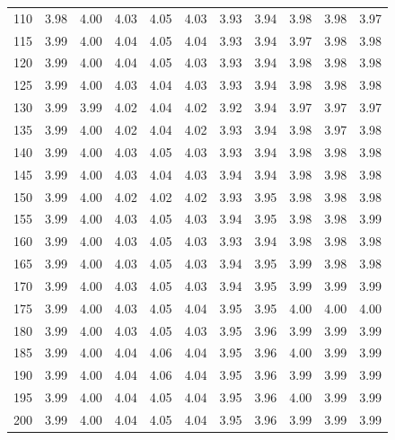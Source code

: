 \documentclass[preprint,12pt]{elsarticle}
\begin{document}
\begin{table}[ht]
\begin{tabular}{c|ccccc|ccccc}
  110 & 3.98 & 4.00 & 4.03 & 4.05 & 4.03 & 3.93 & 3.94 & 3.98 & 3.98 & 3.97 \\ 
  115 & 3.99 & 4.00 & 4.04 & 4.05 & 4.04 & 3.93 & 3.94 & 3.97 & 3.98 & 3.98 \\ 
  120 & 3.99 & 4.00 & 4.04 & 4.05 & 4.03 & 3.93 & 3.94 & 3.98 & 3.98 & 3.98 \\ 
  125 & 3.99 & 4.00 & 4.03 & 4.04 & 4.03 & 3.93 & 3.94 & 3.98 & 3.98 & 3.98 \\ 
  130 & 3.99 & 3.99 & 4.02 & 4.04 & 4.02 & 3.92 & 3.94 & 3.97 & 3.97 & 3.97 \\ 
  135 & 3.99 & 4.00 & 4.02 & 4.04 & 4.02 & 3.93 & 3.94 & 3.98 & 3.97 & 3.98 \\ 
  140 & 3.99 & 4.00 & 4.03 & 4.05 & 4.03 & 3.93 & 3.94 & 3.98 & 3.98 & 3.98 \\ 
  145 & 3.99 & 4.00 & 4.03 & 4.04 & 4.03 & 3.94 & 3.94 & 3.98 & 3.98 & 3.98 \\ 
  150 & 3.99 & 4.00 & 4.02 & 4.02 & 4.02 & 3.93 & 3.95 & 3.98 & 3.98 & 3.98 \\ 
  155 & 3.99 & 4.00 & 4.03 & 4.05 & 4.03 & 3.94 & 3.95 & 3.98 & 3.98 & 3.99 \\ 
  160 & 3.99 & 4.00 & 4.03 & 4.05 & 4.03 & 3.93 & 3.94 & 3.98 & 3.98 & 3.98 \\ 
  165 & 3.99 & 4.00 & 4.03 & 4.05 & 4.03 & 3.94 & 3.95 & 3.99 & 3.98 & 3.98 \\ 
  170 & 3.99 & 4.00 & 4.03 & 4.05 & 4.03 & 3.94 & 3.95 & 3.99 & 3.99 & 3.99 \\ 
  175 & 3.99 & 4.00 & 4.03 & 4.05 & 4.04 & 3.95 & 3.95 & 4.00 & 4.00 & 4.00 \\ 
  180 & 3.99 & 4.00 & 4.03 & 4.05 & 4.03 & 3.95 & 3.96 & 3.99 & 3.99 & 3.99 \\ 
  185 & 3.99 & 4.00 & 4.04 & 4.06 & 4.04 & 3.95 & 3.96 & 4.00 & 3.99 & 3.99 \\ 
  190 & 3.99 & 4.00 & 4.04 & 4.06 & 4.04 & 3.95 & 3.96 & 3.99 & 3.99 & 3.99 \\ 
  195 & 3.99 & 4.00 & 4.04 & 4.05 & 4.04 & 3.95 & 3.96 & 4.00 & 3.99 & 3.99 \\ 
  200 & 3.99 & 4.00 & 4.04 & 4.05 & 4.04 & 3.95 & 3.96 & 3.99 & 3.99 & 3.99 \\ 
   \hline
\end{tabular}
\label{tab:causal1}
\end{table}
\end{document}
